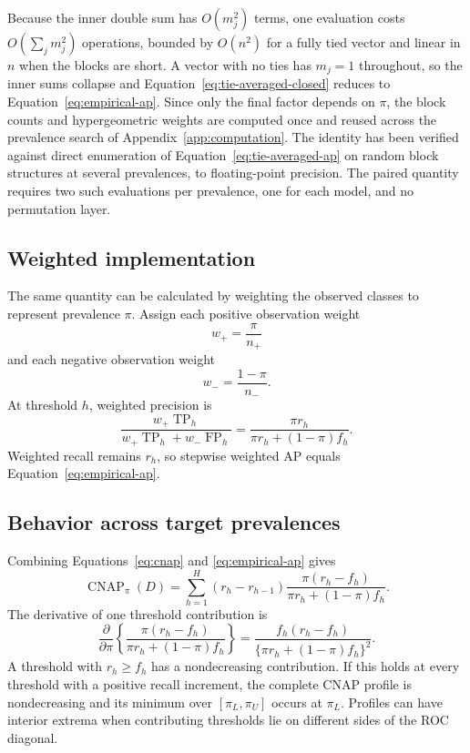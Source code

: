 \documentclass[11pt]{article}
\newcommand{\CNAP}{\operatorname{CNAP}}
\theoremstyle{remark}
\begin{document}
Because the inner double sum has $O(m_j^2)$ terms, one evaluation costs $O(\sum_j m_j^2)$ operations, bounded by $O(n^2)$ for a fully tied vector and linear in $n$ when the blocks are short. A vector with no ties has $m_j=1$ throughout, so the inner sums collapse and Equation~\eqref{eq:tie-averaged-closed} reduces to Equation~\eqref{eq:empirical-ap}. Since only the final factor depends on $\pi$, the block counts and hypergeometric weights are computed once and reused across the prevalence search of Appendix~\ref{app:computation}. The identity has been verified against direct enumeration of Equation~\eqref{eq:tie-averaged-ap} on random block structures at several prevalences, to floating-point precision. The paired quantity requires two such evaluations per prevalence, one for each model, and no permutation layer.

\subsection{Weighted implementation}

The same quantity can be calculated by weighting the observed classes to represent prevalence $\pi$. Assign each positive observation weight
\[
w_+=\frac{\pi}{n_+}
\]
and each negative observation weight
\[
w_-=\frac{1-\pi}{n_-}.
\]
At threshold $h$, weighted precision is
\[
\frac{w_+\operatorname{TP}_h}
{w_+\operatorname{TP}_h+w_-\operatorname{FP}_h}
=
\frac{\pi r_h}
{\pi r_h+(1-\pi)f_h}.
\]
Weighted recall remains $r_h$, so stepwise weighted AP equals Equation~\eqref{eq:empirical-ap}.

\subsection{Behavior across target prevalences}

Combining Equations~\eqref{eq:cnap} and \eqref{eq:empirical-ap} gives
\begin{equation}
\CNAP_\pi(D)
=
\sum_{h=1}^{H}
(r_h-r_{h-1})
\frac{\pi(r_h-f_h)}
{\pi r_h+(1-\pi)f_h}.
\label{eq:empirical-cnap-profile}
\end{equation}
The derivative of one threshold contribution is
\begin{equation}
\frac{\partial}{\partial\pi}
\left\{
\frac{\pi(r_h-f_h)}
{\pi r_h+(1-\pi)f_h}
\right\}
=
\frac{f_h(r_h-f_h)}
{\{\pi r_h+(1-\pi)f_h\}^2}.
\label{eq:profile-derivative}
\end{equation}
A threshold with $r_h\geq f_h$ has a nondecreasing contribution. If this holds at every threshold with a positive recall increment, the complete CNAP profile is nondecreasing and its minimum over $[\pi_L,\pi_U]$ occurs at $\pi_L$. Profiles can have interior extrema when contributing thresholds lie on different sides of the ROC diagonal.
\end{document}
